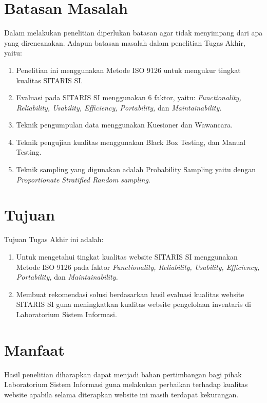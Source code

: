 \section{Batasan Masalah}
Dalam melakukan penelitian diperlukan batasan agar tidak menyimpang dari apa yang direncanakan. Adapun batasan masalah dalam penelitian Tugas Akhir, yaitu:
\begin{enumerate}
	\item Penelitian ini menggunakan Metode ISO 9126 untuk mengukur tingkat kualitas SITARIS SI.
	\item Evaluasi pada SITARIS SI menggunakan 6 faktor, yaitu: \textit{Functionality, Reliability, Usability, Efficiency, Portability,} dan \textit{Maintainability.} 
	\item Teknik pengumpulan data menggunakan Kuesioner dan Wawancara.
	\item Teknik pengujian kualitas menggunakan Black Box Testing, dan Manual Testing.
	\item Teknik sampling yang digunakan adalah Probability Sampling yaitu dengan \textit{Proportionate Stratified Random sampling}.
\end{enumerate}

\section{Tujuan}
Tujuan Tugas Akhir ini adalah:
\begin{enumerate}
	\item Untuk mengetahui tingkat kualitas website SITARIS SI menggunakan Metode ISO 9126 pada faktor \textit{Functionality, Reliability, Usability, Efficiency, Portability,} dan \textit{Maintainability.} 
	\item Membuat rekomendasi solusi berdasarkan hasil evaluasi kualitas website SITARIS SI guna meningkatkan kualitas website pengelolaan inventaris di Laboratorium Sistem Informasi.	
\end{enumerate}

\section{Manfaat}
Hasil penelitian diharapkan dapat menjadi bahan pertimbangan bagi pihak Laboratorium Sistem Informasi guna melakukan perbaikan terhadap kualitas website apabila selama diterapkan website ini masih terdapat kekurangan.


